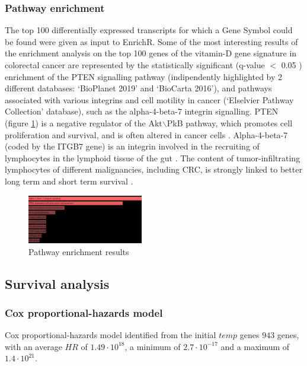 \documentclass[fleqn,10pt]{SelfArx} %
\begin{document}
		\subsubsection{Pathway enrichment}
		The top 100 differentially expressed transcripts for which a Gene Symbol could be found were given as input to EnrichR.
		Some of the most interesting results of the enrichment analysis on the top 100 genes of the vitamin-D gene signature in colorectal cancer are represented by the statistically significant (q-value $<$ 0.05 ) enrichment of the PTEN signalling pathway (indipendently highlighted by 2 different databases: ‘BioPlanet 2019’ and ‘BioCarta 2016’), and pathways associated with various integrins and cell motility in cancer (‘Elselvier Pathway Collection’ database), such as the alpha-4-beta-7 integrin signalling.
PTEN (figure \ref{fig:pten}) is a negative regulator of the Akt$\backslash$PkB pathway, which promotes cell proliferation and survival, and is often altered in cancer cells \cite{chalhoub2009pten}.
Alpha-4-beta-7 (coded by the ITGB7 gene) is an integrin involved in the recruiting of lymphocytes in the lymphoid tissue of the gut \cite{Alpha}.
The content of tumor-infiltrating lymphocytes of different malignancies, including CRC, is strongly linked to better long term and short term survival \cite{fuchs2020assessment}.


		\begin{figure}[ht]
			\includegraphics[width=0.45\textwidth]{figures/pten.png}
			\caption{Pathway enrichment results}
			\label{fig:pten}
		\end{figure}

	\subsection{Survival analysis}

		\subsubsection{Cox proportional-hazards model}
		Cox proportional-hazards model identified from the initial $temp$ genes $943$ genes, with an average $HR$ of $1.49\cdot 10^{18}$, a minimum of $2.7\cdot 10^{-17}$ and a maximum of $1.4\cdot 10^{21}$.
\end{document}
